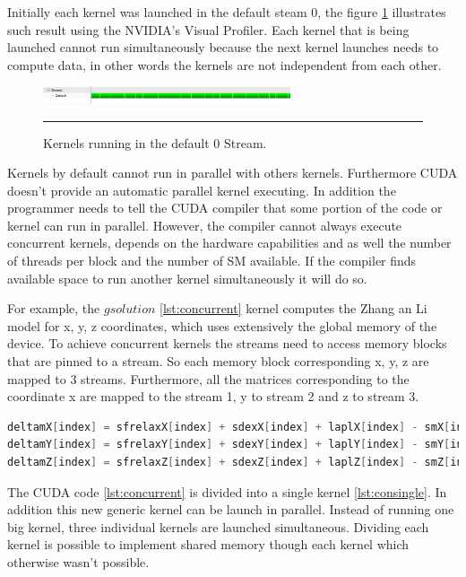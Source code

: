 Initially each kernel was launched in the default steam 0, the figure \ref{fig:streams} illustrates such result using the NVIDIA's Visual Profiler. Each kernel that is being launched cannot run simultaneously because the next kernel launches needs to compute data, in other words the kernels are not independent from each other.

\begin{figure}[htbp]
	\centering
		\includegraphics[width=0.65\textwidth]{Figures/ini_steams.png}
		\rule{35em}{0.2pt}
	\caption[Initial Streams]{Kernels running in the default 0 Stream.
}
	\label{fig:streams}
\end{figure}

 Kernels by default cannot run in parallel with others kernels. Furthermore CUDA doesn't provide an automatic parallel kernel executing. In addition the programmer needs to tell the CUDA compiler that some portion of the code or kernel can run in parallel. However, the compiler cannot always execute concurrent kernels, depends on the hardware capabilities and as well the number of threads per block and the number of SM available. If the compiler finds available space to run another kernel simultaneously it will do so. 

For example, the $gsolution$ \ref{lst:concurrent} kernel computes the Zhang an Li model for x, y, z coordinates, which uses extensively the global memory of the device. To achieve concurrent kernels the streams need to access memory blocks that are pinned to a stream. So each memory block corresponding x, y, z are mapped to 3 streams. Furthermore, all the matrices corresponding to the coordinate x are mapped to the stream 1, y to stream 2 and z to stream 3.

\begin{lstlisting}[language=C++, label={lst:concurrent}, caption={Evaluation of x, y, z coordinates of the Zhang and Li model in a single kernel.}]
deltamX[index] = sfrelaxX[index] + sdexX[index] + laplX[index] - smX[index];
deltamY[index] = sfrelaxY[index] + sdexY[index] + laplY[index] - smY[index];
deltamZ[index] = sfrelaxZ[index] + sdexZ[index] + laplZ[index] - smZ[index];
\end{lstlisting}
 
The CUDA code \ref{lst:concurrent} is divided into a single kernel \ref{lst:consingle}. In addition this new generic kernel can be launch in parallel. Instead of running one big kernel, three individual kernels are launched simultaneous. Dividing each kernel is possible to implement shared memory though each kernel which otherwise wasn't possible. 

